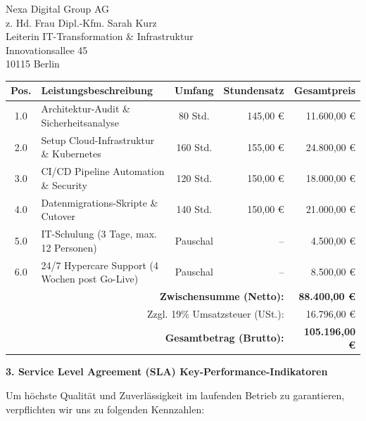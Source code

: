 \documentclass[11pt,a4paper]{dinbrief}
\begin{document}
\begin{letter}{%
  Nexa Digital Group AG\\
  z. Hd. Frau Dipl.-Kfm. Sarah Kurz\\
  Leiterin IT-Transformation \& Infrastruktur\\
  Innovationsallee 45\\
  10115 Berlin
}
\vspace{0.2cm}
\noindent
\begin{tabularx}{\textwidth}{c X c r r}
\toprule
\textbf{Pos.} & \textbf{Leistungsbeschreibung} & \textbf{Umfang} & \textbf{Stundensatz} & \textbf{Gesamtpreis} \\
\midrule
1.0 & Architektur-Audit \& Sicherheitsanalyse & 80 Std. & 145,00 € & 11.600,00 € \\
2.0 & Setup Cloud-Infrastruktur \& Kubernetes & 160 Std. & 155,00 € & 24.800,00 € \\
3.0 & CI/CD Pipeline Automation \& Security & 120 Std. & 150,00 € & 18.000,00 € \\
4.0 & Datenmigrations-Skripte \& Cutover & 140 Std. & 150,00 € & 21.000,00 € \\
5.0 & IT-Schulung (3 Tage, max. 12 Personen) & Pauschal & -- & 4.500,00 € \\
6.0 & 24/7 Hypercare Support (4 Wochen post Go-Live) & Pauschal & -- & 8.500,00 € \\
\midrule
\multicolumn{4}{r}{\textbf{Zwischensumme (Netto):}} & \textbf{88.400,00 €} \\
\multicolumn{4}{r}{Zzgl. 19\% Umsatzsteuer (USt.):} & 16.796,00 € \\
\midrule
\multicolumn{4}{r}{\textbf{\Large Gesamtbetrag (Brutto):}} & \textbf{\Large 105.196,00 €} \\
\bottomrule
\end{tabularx}

\vspace{0.3cm}
\textcolor{navyprimary}{\large\textbf{3. Service Level Agreement (SLA) Key-Performance-Indikatoren}}

Um höchste Qualität und Zuverlässigkeit im laufenden Betrieb zu garantieren, verpflichten wir uns zu folgenden Kennzahlen:


\end{letter}
\end{document}
